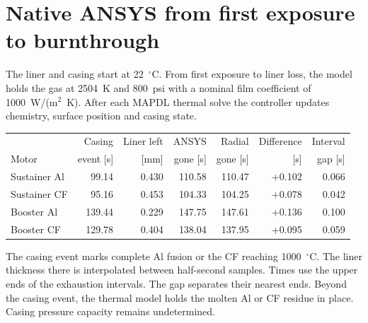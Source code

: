 \section{Native ANSYS from first exposure to burnthrough}\label{sec:whole}
The liner and casing start at 22~$^\circ$C. From first exposure to liner loss,
the model holds the gas at 2504~K and 800~psi with a nominal film coefficient of
1000~W/(m$^2$~K). After each MAPDL thermal solve the controller updates
chemistry, surface position and casing state.

\begin{center}\small\begin{tabular}{lrrrrrr}\toprule
 & Casing & Liner left & ANSYS & Radial & Difference & Interval\\
Motor & event [s] & [mm] & gone [s] & gone [s] & [s] & gap [s]\\\midrule
Sustainer Al & 99.14 & 0.430 & 110.58 & 110.47 & +0.102 & 0.066 \\
Sustainer CF & 95.16 & 0.453 & 104.33 & 104.25 & +0.078 & 0.042 \\
Booster Al & 139.44 & 0.229 & 147.75 & 147.61 & +0.136 & 0.100 \\
Booster CF & 129.78 & 0.404 & 138.04 & 137.95 & +0.095 & 0.059 \\
\bottomrule\end{tabular}\end{center}
The casing event marks complete Al fusion or the CF reaching 1000~$^\circ$C.
The liner thickness there is interpolated between half-second samples. Times
use the upper ends of the exhaustion intervals. The gap separates their nearest
ends. Beyond the casing event, the thermal model holds the molten Al or CF
residue in place. Casing pressure capacity remains undetermined.

